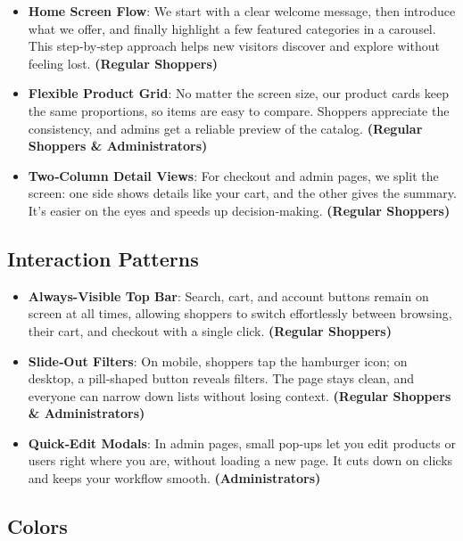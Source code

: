 \documentclass[12pt]{article}
\begin{document}
	\begin{itemize}
	\item \textbf{Home Screen Flow}: We start with a clear welcome message, then introduce what we offer, and finally highlight a few featured categories in a carousel. This step‑by‑step approach helps new visitors discover and explore without feeling lost. \textbf{(Regular Shoppers)}
	\item \textbf{Flexible Product Grid}: No matter the screen size, our product cards keep the same proportions, so items are easy to compare. Shoppers appreciate the consistency, and admins get a reliable preview of the catalog. \textbf{(Regular Shoppers \& Administrators)}
	\item \textbf{Two‑Column Detail Views}: For checkout and admin pages, we split the screen: one side shows details like your cart, and the other gives the summary. It’s easier on the eyes and speeds up decision‑making. \textbf{(Regular Shoppers)}
	\end{itemize}

	\subsection{Interaction Patterns}\label{subsec:interaction-patterns}

	\begin{itemize}
	\item \textbf{Always-Visible Top Bar}: Search, cart, and account buttons remain on screen at all times, allowing shoppers to switch effortlessly between browsing, their cart, and checkout with a single click. \textbf{(Regular Shoppers)}
	\item \textbf{Slide‑Out Filters}: On mobile, shoppers tap the hamburger icon; on desktop, a pill‑shaped button reveals filters. The page stays clean, and everyone can narrow down lists without losing context. \textbf{(Regular Shoppers \& Administrators)}
	\item \textbf{Quick‑Edit Modals}: In admin pages, small pop‑ups let you edit products or users right where you are, without loading a new page. It cuts down on clicks and keeps your workflow smooth. \textbf{(Administrators)}
	\end{itemize}

	\subsection{Colors}\label{subsec:colors}
\end{document}
